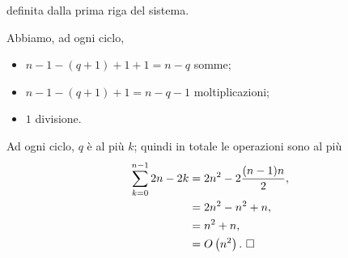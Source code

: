 definita dalla prima riga del sistema.
\par Abbiamo, ad ogni ciclo,
\begin{itemize}
  \item $n - 1 - (q + 1) + 1 + 1 = n - q$ somme;
  \item $n - 1 - (q + 1) + 1 = n - q - 1$ moltiplicazioni;
  \item $1$ divisione.
\end{itemize}
\par Ad ogni ciclo, $q$ \`e al pi\`u $k$; quindi in totale le operazioni
sono al pi\`u
\begin{align*}
  \sum_{k = 0}^{n - 1} 2n - 2k
  &= 2n^2 - 2 \frac{(n - 1)n}{2},\\
  &= 2n^2 - n^2 + n,\\
  &= n^2 + n,\\
  &= O \left ( n^2 \right ).\text{ $\square$}
\end{align*}
